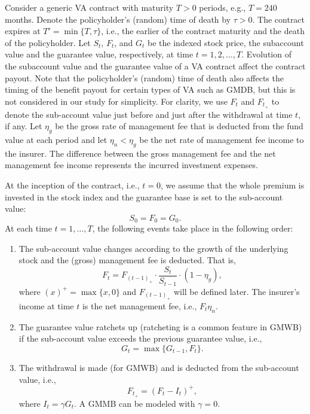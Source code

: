 Consider a generic VA contract with maturity $T>0$ periods, e.g., $T=240$ months.
Denote the policyholder's (random) time of death by $\tau>0$.
The contract expires at $T'=\min\{T,\tau\}$, i.e., the earlier of the contract maturity and the death of the policyholder.
Let $S_t$, $F_t$, and $G_t$ be the indexed stock price, the subaccount value and the guarantee value, respectively, at time $t=1,2,\ldots,T$.
Evolution of the subaccount value and the guarantee value of a VA contract affect the contract payout.
Note that the policyholder's (random) time of death also affects the timing of the benefit payout for certain types of VA such as GMDB, but this is not considered in our study for simplicity.
For clarity, we use $F_t$ and $F_{t_+}$ to denote the sub-account value just before and just after the withdrawal at time $t$, if any.
Let $\eta_g$ be the gross rate of management fee that is deducted from the fund value at each period and let $\eta_n < \eta_g$ be the net rate of management fee income to the insurer.
The difference between the gross management fee and the net management fee income represents the incurred investment expenses.

At the inception of the contract, i.e., $t=0$, we assume that the whole premium is invested in the stock index and the guarantee base is set to the sub-account value:
\begin{equation*}
    S_0=F_0=G_0.
\end{equation*}
At each time $t=1,\ldots,T$, the following events take place in the following order:
\begin{enumerate}
    \item The sub-account value changes according to the growth of the underlying stock and the (gross) management fee is deducted. That is, 
        \begin{equation*}
            F_t = F_{(t-1)_+}\cdot\frac{S_{t}}{S_{t-1}}\cdot(1-\eta_g),
        \end{equation*} 
    where $(x)^+=\max\{x,0\}$ and $F_{(t-1)_+}$ will be defined later. The insurer's income at time $t$ is the net management fee, i.e., $F_t\eta_n$. 

    \item The guarantee value ratchets up (ratcheting is a common feature in GMWB) if the sub-account value exceeds the previous guarantee value, i.e., 
        \begin{equation*}
            G_t = \max\{G_{t-1},F_t\}.
        \end{equation*} 

    \item The withdrawal is made (for GMWB) and is deducted from the sub-account value, i.e., 
        \begin{equation*}
            F_{t_+} = (F_t - I_t)^+,
        \end{equation*} 
    where $I_t = \gamma G_t$. A GMMB can be modeled with $\gamma = 0$.
\end{enumerate}

